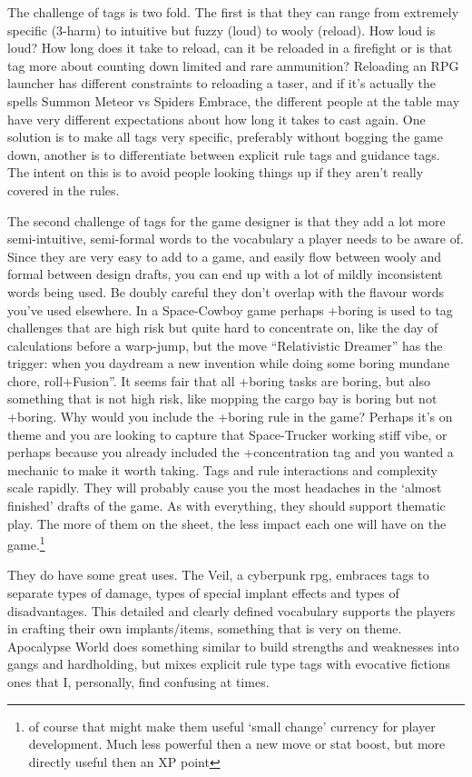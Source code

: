 \documentclass{tufte-handout}
\begin{document}
The challenge of tags is two fold. The first is that they can range from extremely specific (3-harm) to intuitive but fuzzy (loud) to wooly (reload). How loud is loud? How long does it take to reload, can it be reloaded in a firefight or is that tag more about counting down limited and rare ammunition? Reloading an RPG launcher has different constraints to reloading a taser, and if it's actually the spells Summon Meteor vs Spiders Embrace, the different people at the table may have very different expectations about how long it takes to cast again. One solution is to make all tags very specific, preferably without bogging the game down, another is to differentiate between explicit rule tags and guidance tags. The intent on this is to avoid people looking things up if they aren't really covered in the rules. 

The second challenge of tags for the game designer is that they add a lot more semi-intuitive, semi-formal   words to the vocabulary a player needs to be aware of.  Since they are very easy to add to a game, and easily flow between wooly and formal between design drafts, you can end up with a lot of mildly inconsistent words being used. Be doubly careful they don't overlap with the flavour words you've used elsewhere. In a Space-Cowboy game perhaps +boring is used to tag challenges that are high risk but quite hard to concentrate on, like the day of calculations before a warp-jump, but the move ``Relativistic Dreamer'' has the trigger: when you daydream a new invention while doing some boring mundane chore, roll+Fusion''. It seems fair that all +boring tasks are boring, but also something that is not high risk, like mopping the cargo bay is boring but not +boring.
Why would you include the +boring rule in the game? Perhaps it's on theme and you are looking to capture that Space-Trucker working stiff vibe, or perhaps because you already included the +concentration tag and you wanted a mechanic to make it worth taking. Tags and rule interactions and complexity scale rapidly. They will probably cause you the most headaches in the `almost finished' drafts of the game. As with everything, they should support thematic play. The more of them on the sheet, the less impact each one will have on the game.\footnote{of course that might make them useful `small change' currency for player development. Much less powerful then a new move or stat boost, but more directly useful then an XP point}

They do have some great uses. The Veil, a cyberpunk rpg, embraces tags to separate types of damage, types of special implant effects and types of disadvantages. This detailed and clearly defined vocabulary supports the players in crafting their own implants/items, something that is very on theme. Apocalypse World does something similar to build strengths and weaknesses into gangs and hardholding, but mixes explicit rule type tags with evocative fictions ones that I, personally, find confusing at times.
\end{document}
